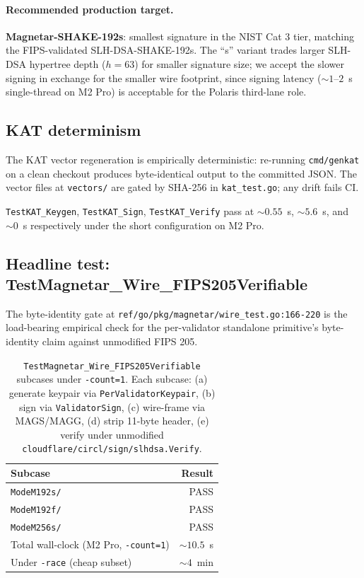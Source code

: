 \paragraph{Recommended production target.}
\textbf{Magnetar-SHAKE-192s}: smallest signature in the NIST Cat 3
tier, matching the FIPS-validated SLH-DSA-SHAKE-192s. The ``s''
variant trades larger SLH-DSA hypertree depth ($h=63$) for smaller
signature size; we accept the slower signing in exchange for the
smaller wire footprint, since signing latency ($\sim 1$--$2$~s
single-thread on M2 Pro) is acceptable for the Polaris third-lane
role.

\subsection{KAT determinism}
\label{sec:eval:kat}

The KAT vector regeneration is empirically deterministic: re-running
\texttt{cmd/genkat} on a clean checkout produces byte-identical
output to the committed JSON. The vector files at \texttt{vectors/}
are gated by SHA-256 in \texttt{kat\_test.go}; any drift fails CI.

\texttt{TestKAT\_Keygen}, \texttt{TestKAT\_Sign},
\texttt{TestKAT\_Verify} pass at $\sim 0.55$~s, $\sim 5.6$~s, and
$\sim 0$~s respectively under the short configuration on M2 Pro.

\subsection{Headline test: TestMagnetar\_Wire\_FIPS205Verifiable}
\label{sec:eval:wirefips}

The byte-identity gate at
\texttt{ref/go/pkg/magnetar/wire\_test.go:166-220} is the
load-bearing empirical check for the per-validator standalone
primitive's byte-identity claim against unmodified FIPS 205.

\begin{table}[H]
\centering
\caption{\texttt{TestMagnetar\_Wire\_FIPS205Verifiable} subcases
under \texttt{-count=1}. Each subcase: (a) generate keypair via
\texttt{PerValidatorKeypair}, (b) sign via \texttt{ValidatorSign},
(c) wire-frame via MAGS/MAGG, (d) strip 11-byte header, (e) verify
under unmodified \texttt{cloudflare/circl/sign/slhdsa.Verify}.}
\label{tab:eval-wirefips}
\begin{tabular}{lr}
\toprule
Subcase & Result \\
\midrule
\texttt{ModeM192s/} & PASS \\
\texttt{ModeM192f/} & PASS \\
\texttt{ModeM256s/} & PASS \\
\midrule
Total wall-clock (M2 Pro, \texttt{-count=1}) & $\sim 10.5$~s \\
Under \texttt{-race} (cheap subset) & $\sim 4$~min \\
\bottomrule
\end{tabular}
\end{table}

